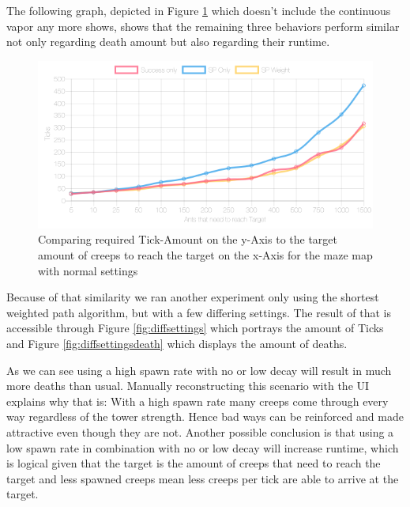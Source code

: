 The following graph, depicted in Figure \ref{fig:threesame} which doesn't include the continuous vapor any more shows, shows that the remaining three behaviors perform similar not only regarding death amount but also regarding their runtime.

\begin{figure}[H]
  \centering
  \includegraphics[width=1\linewidth]{images/normalsquaremaze-ticks-line}
  \caption{Comparing required Tick-Amount on the y-Axis to the target amount of creeps to reach the target on the x-Axis for the maze map with normal settings}
  \label{fig:threesame}
\end{figure}

Because of that similarity we ran another experiment only using the shortest weighted path algorithm, but with a few differing settings. The result of that is accessible through Figure \ref{fig:diffsettings} which portrays the amount of Ticks and Figure \ref{fig:diffsettingsdeath} which displays the amount of deaths.

As we can see using a high spawn rate with no or low decay will result in much more deaths than usual. Manually reconstructing this scenario with the UI explains why that is: With a high spawn rate many creeps come through every way regardless of the tower strength. Hence bad ways can be reinforced and made attractive even though they are not.
Another possible conclusion is that using a low spawn rate in combination with no or low decay will increase runtime, which is logical given that the target is the amount of creeps that need to reach the target and less spawned creeps mean less creeps per tick are able to arrive at the target. 

